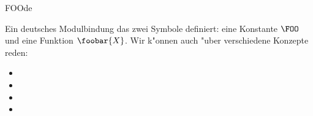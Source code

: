 \begin{mhmodnl}{FOO}{de}
  \begin{definition}
    Ein deutsches Modulbindung das zwei Symbole definiert: eine Konstante $\FOO$ und eine
    Funktion $\foobar{X}$. Wir k"onnen auch "uber verschiedene Konzepte reden:
    \begin{itemize}
    \item   {}
    \item   {}
    \item   {}
    \item   {}
    \end{itemize}
  \end{definition}
\end{mhmodnl}

